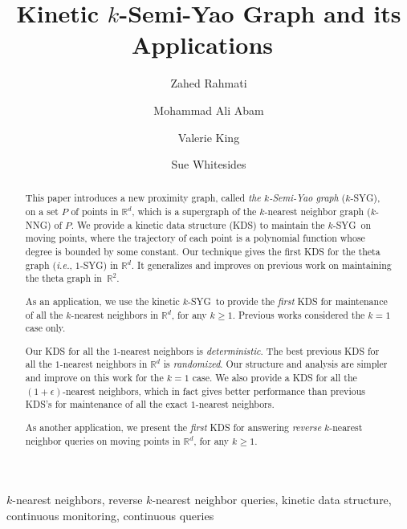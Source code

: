 \documentclass[preprint,12pt]{elsarticle}
\def\knng{\mbox{$k$-NNG}}
\def\ksyg{\mbox{$k$-SYG}}
\def\1syg{\mbox{$1$-SYG}}
\newcommand{\ie}{\emph{i.e.}}
\begin{document}
\begin{frontmatter}


\title{Kinetic $k$-Semi-Yao Graph and its Applications~}



\author{Zahed Rahmati}

\author[rvt2]{Mohammad Ali Abam}

\author[rvt1]{Valerie King}

\author[rvt1]{Sue Whitesides}





\address[rvt2]{Dept. of Computer Engineering, Sharif University of Technology, Tehran, Iran.}
\address[rvt1]{Dept. of Computer Science, University of Victoria, Victoria, Canada.}



\begin{abstract}
This paper introduces a new proximity graph, called \textit{the $k$-Semi-Yao graph} (\ksyg), on a set $P$ of points in $\mathbb{R}^d$, which is a supergraph of the $k$-nearest neighbor graph (\knng) of $P$. We provide a kinetic data structure (KDS) to maintain the \ksyg~on moving points, where the trajectory of each point is a polynomial function whose degree is bounded by some constant. Our technique gives the first KDS for the theta graph (\ie, \1syg) in $\mathbb{R}^d$. It generalizes and improves on previous work on maintaining the theta graph in~$\mathbb{R}^2$. 

As an application, we use the kinetic \ksyg~to provide the \textit{first} KDS for maintenance of all the $k$-nearest neighbors in $\mathbb{R}^d$, for any $k\geq 1$. Previous works considered the $k=1$ case only.

Our KDS for all the $1$-nearest neighbors is \textit{deterministic}. The best previous KDS for all the $1$-nearest neighbors in $ \mathbb{R}^d$ is \textit{randomized}. Our structure and analysis are simpler and improve on this work for the $k=1$ case. We also provide a KDS for all the $(1+\epsilon)$-nearest neighbors, which in fact gives better performance than previous KDS's for maintenance of all the exact $1$-nearest neighbors.

As another application, we present the \textit{first} KDS for answering \textit{reverse} $k$-nearest neighbor queries on moving points in $ \mathbb{R}^d$, for any $k\geq 1$.
\end{abstract}
\begin{keyword}
$k$-nearest neighbors, reverse $k$-nearest neighbor queries, kinetic data structure, continuous monitoring, continuous queries
\end{keyword}

\end{frontmatter}
\end{document}
